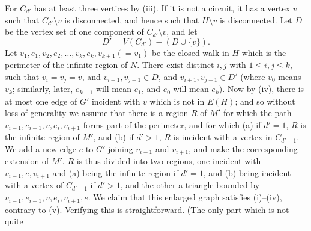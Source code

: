 For $C_{d'}$ has at least three vertices by (iii). If it is not a circuit, it has a vertex $v$ such that $C_{d'} \setminus v$ is disconnected, and hence such that $H \setminus v$ is disconnected. Let $D$ be the vertex set of one component of $C_{d'} \setminus v$, and let
\begin{equation*}
D' = V(C_{d'}) - (D \cup \{v\}).
\end{equation*}
Let $v_1, e_1, v_2, e_2, \dots, v_k, e_k, v_{k+1}(=v_1)$ be the closed walk in $H$ which is the perimeter of the infinite region of $N$. There exist distinct $i, j$ with $1 \le i, j \le k$, such that $v_i = v_j = v$, and $v_{i-1}, v_{j+1} \in D$, and $v_{i+1}, v_{j-1} \in D'$ (where $v_0$ means $v_k$; similarly, later, $e_{k+1}$ will mean $e_1$, and $e_0$ will mean $e_k$). Now by (iv), there is at most one edge of $G'$ incident with $v$ which is not in $E(H)$; and so without loss of generality we assume that there is a region $R$ of $M'$ for which the path $v_{i-1}, e_{i-1}, v, e_i, v_{i+1}$ forms part of the perimeter, and for which (a) if $d' = 1$, $R$ is the infinite region of $M'$, and (b) if $d' > 1$, $R$ is incident with a vertex in $C_{d'-1}$. We add a new edge $e$ to $G'$ joining $v_{i-1}$ and $v_{i+1}$, and make the corresponding extension of $M'$. $R$ is thus divided into two regions, one incident with $v_{i-1}, e, v_{i+1}$ and (a) being the infinite region if $d' = 1$, and (b) being incident with a vertex of $C_{d'-1}$ if $d' > 1$, and the other a triangle bounded by $v_{i-1}, e_{i-1}, v, e_i, v_{i+1}, e$. We claim that this enlarged graph satisfies (i)--(iv), contrary to (v). Verifying this is straightforward. (The only part which is not quite
